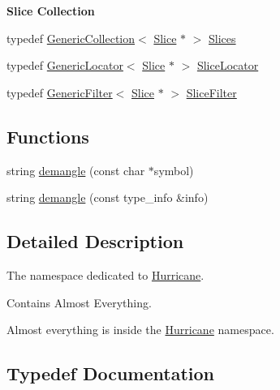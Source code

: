 \begin{Indent}\textbf{ Slice Collection}\par
\begin{DoxyCompactItemize}
\item 
typedef \mbox{\hyperlink{classHurricane_1_1GenericCollection}{Generic\+Collection}}$<$ \mbox{\hyperlink{classHurricane_1_1Slice}{Slice}} $\ast$ $>$ \mbox{\hyperlink{namespaceHurricane_aa4a7e8a563c5687621eb5e57ade1706a}{Slices}}
\item 
typedef \mbox{\hyperlink{classHurricane_1_1GenericLocator}{Generic\+Locator}}$<$ \mbox{\hyperlink{classHurricane_1_1Slice}{Slice}} $\ast$ $>$ \mbox{\hyperlink{namespaceHurricane_a5c3b720aae3437342e9d6c57729dc895}{Slice\+Locator}}
\item 
typedef \mbox{\hyperlink{classHurricane_1_1GenericFilter}{Generic\+Filter}}$<$ \mbox{\hyperlink{classHurricane_1_1Slice}{Slice}} $\ast$ $>$ \mbox{\hyperlink{namespaceHurricane_a80703f9d02b235f3291fabbf53f86d4e}{Slice\+Filter}}
\end{DoxyCompactItemize}
\end{Indent}
\subsection*{Functions}
\begin{DoxyCompactItemize}
\item 
string \mbox{\hyperlink{group__Generalities_ga93af87d1b7b19294382ba6dae51d0363}{demangle}} (const char $\ast$symbol)
\item 
string \mbox{\hyperlink{group__Generalities_gae4be209e8a3f2227b0c7a22246817c6f}{demangle}} (const type\+\_\+info \&info)
\end{DoxyCompactItemize}


\subsection{Detailed Description}
The namespace dedicated to \mbox{\hyperlink{namespaceHurricane}{Hurricane}}. 

Contains Almost Everything.

Almost everything is inside the \mbox{\hyperlink{namespaceHurricane}{Hurricane}} namespace. 

\subsection{Typedef Documentation}
\mbox{\label{namespaceHurricane_a0aa3882e095f9d425c253223d1c0793d}} 
